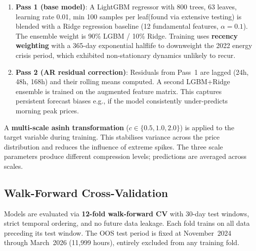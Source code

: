 \documentclass[11pt,a4paper]{article}
\begin{document}
\begin{enumerate}
  \item \textbf{Pass 1 (base model)}: A LightGBM regressor with 800 trees, 63 leaves, learning rate 0.01, min 100 samples per leaf(found via extensive testing) is blended with a Ridge regression baseline (12 fundamental features, $\alpha = 0.1$). The ensemble weight is 90\% LGBM / 10\% Ridge. Training uses \textbf{recency weighting} with a 365-day exponential halflife to downweight the 2022 energy crisis period, which exhibited non-stationary dynamics unlikely to recur.

  \item \textbf{Pass 2 (AR residual correction)}: Residuals from Pass~1 are lagged (24h, 48h, 168h) and their rolling means computed. A second LGBM+Ridge ensemble is trained on the augmented feature matrix. This captures persistent forecast biases e.g., if the model consistently under-predicts morning peak prices.
\end{enumerate}

A \textbf{multi-scale asinh transformation} ($c \in \{0.5, 1.0, 2.0\}$) is applied to the target variable during training. This stabilises variance across the price distribution and reduces the influence of extreme spikes. The three scale parameters produce different compression levels; predictions are averaged across scales.

\subsection{Walk-Forward Cross-Validation}

Models are evaluated via \textbf{12-fold walk-forward CV} with 30-day test windows, strict temporal ordering, and no future data leakage. Each fold trains on all data preceding its test window. The OOS test period is fixed at November~2024 through March~2026 (11{,}999 hours), entirely excluded from any training fold.



\end{document}
